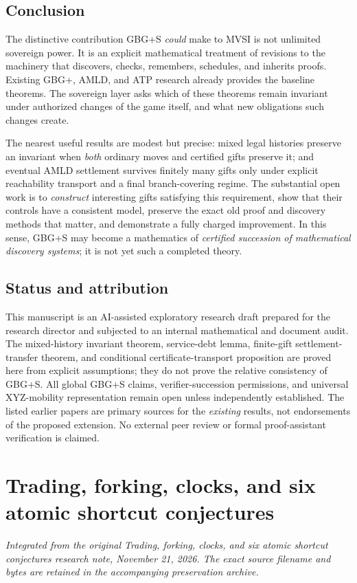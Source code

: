 \documentclass[11pt,letterpaper]{article}
\theoremstyle{definition}\newtheorem{definition}[theorem]{Definition}\newtheorem{example}[theorem]{Example}
\theoremstyle{remark}\newtheorem{remark}[theorem]{Remark}
\begin{document}
\subsection{Conclusion}
The distinctive contribution GBG+S \emph{could} make to MVSI is not unlimited sovereign power. It is an explicit mathematical treatment of revisions to the machinery that discovers, checks, remembers, schedules, and inherits proofs. Existing GBG+, AMLD, and ATP research already provides the baseline theorems. The sovereign layer asks which of these theorems remain invariant under authorized changes of the game itself, and what new obligations such changes create.

The nearest useful results are modest but precise: mixed legal histories preserve an invariant when \emph{both} ordinary moves and certified gifts preserve it; and eventual AMLD settlement survives finitely many gifts only under explicit reachability transport and a final branch-covering regime. The substantial open work is to \emph{construct} interesting gifts satisfying this requirement, show that their controls have a consistent model, preserve the exact old proof and discovery methods that matter, and demonstrate a fully charged improvement. In this sense, GBG+S may become a mathematics of \emph{certified succession of mathematical discovery systems}; it is not yet such a completed theory.

\subsection*{Status and attribution}
This manuscript is an AI-assisted exploratory research draft prepared for the research director and subjected to an internal mathematical and document audit. The mixed-history invariant theorem, service-debt lemma, finite-gift settlement-transfer theorem, and conditional certificate-transport proposition are proved here from explicit assumptions; they do not prove the relative consistency of GBG+S. All global GBG+S claims, verifier-succession permissions, and universal XYZ-mobility representation remain open unless independently established. The listed earlier papers are primary sources for the \emph{existing} results, not endorsements of the proposed extension. No external peer review or formal proof-assistant verification is claimed.





\section{Trading, forking, clocks, and six atomic shortcut conjectures}\label{br:sec:short}
\noindent\textit{Integrated from the original Trading, forking, clocks, and six atomic shortcut conjectures research note, November 21, 2026. The exact source filename and bytes are retained in the accompanying preservation archive.}
\end{document}
